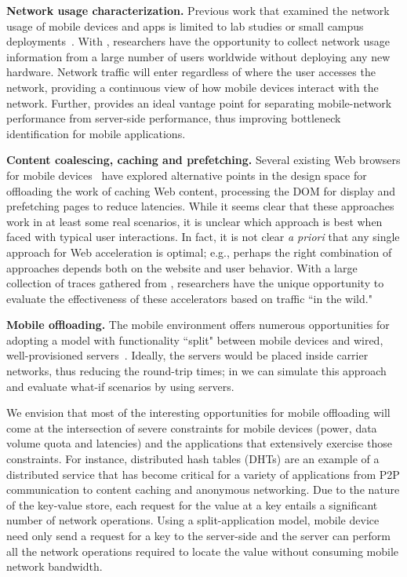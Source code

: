\noindent\textbf{Network usage characterization.} Previous work that examined the network usage of 
mobile devices and apps is limited to lab studies or small campus deployments~\cite{enck:taintdroid,wsj:apps-watching-you}. 
With \meddle, researchers have the opportunity to collect network usage information from 
a large number of users worldwide without deploying any new hardware. 
Network traffic will enter \meddle regardless of where the user accesses the network, providing 
a continuous view of how mobile devices interact with the network. 
Further, \meddle provides an 
ideal vantage point for separating mobile-network performance from server-side performance, 
thus improving bottleneck identification for mobile applications.

\noindent\textbf{Content coalescing, caching and prefetching.} Several existing Web browsers for mobile 
devices~\cite{silk,opera-mini,google-spdy} have explored alternative points in the design space for offloading the work 
of caching Web content, processing the DOM for display and prefetching pages to reduce 
latencies. While it seems clear that these approaches work in at least some real scenarios, it 
is unclear which approach is best when faced with typical user interactions. In fact, it is not clear 
\emph{a priori} that any single approach for Web acceleration is optimal; e.g., perhaps the right 
combination of approaches depends both on the website and user behavior. With a large collection 
of traces gathered from \meddle, researchers have the unique opportunity to evaluate the 
effectiveness of these accelerators based on traffic ``in the wild." 

\noindent\textbf{Mobile offloading.} The mobile environment offers
numerous opportunities for adopting a model with functionality
``split" between mobile devices and wired, well-provisioned
servers~\cite{chun:clonecloud,cuervo:maui}. Ideally, the servers would
be placed inside carrier networks, thus reducing the round-trip times;
in \meddle we can simulate this approach and evaluate what-if
scenarios by using \meddle servers.

We envision that most of the interesting opportunities for mobile
offloading will come at the intersection of severe constraints for
mobile devices (power, data volume quota and latencies) and the
applications that extensively exercise those constraints. For instance,
distributed hash tables (DHTs) are an example of a distributed service
that has become critical for a variety of applications from P2P
communication to content caching and anonymous networking.  Due to the
nature of the key-value store, each request for the value at a key
entails a significant number of network operations. Using a
split-application model, mobile device need only send a request for a
key to the server-side and the server can perform all the network
operations required to locate the value without consuming mobile
network bandwidth.


